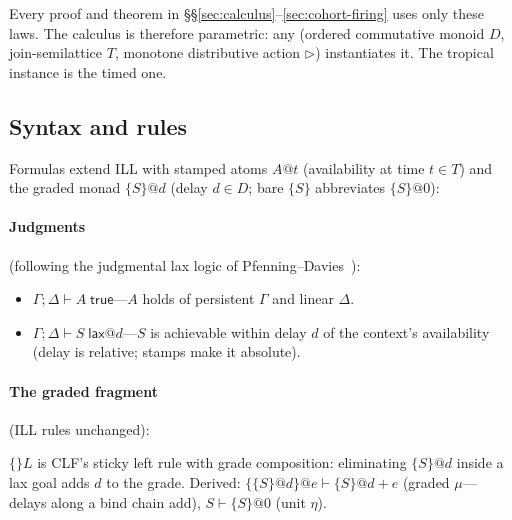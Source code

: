 \documentclass[11pt]{article}
\makeatletter
\newcommand{\action}{\triangleright}            %
\newcommand{\laxm}[2]{\{#1\}@{#2}}
\newcommand{\laxb}[1]{\{#1\}}
\newcommand{\jtrue}[1]{#1\;\mathsf{true}}
\newcommand{\jlax}[2]{#1\;\mathsf{lax}@{#2}}
\theoremstyle{remark}
\makeatother
\begin{document}
Every proof and theorem in \S\S\ref{sec:calculus}--\ref{sec:cohort-firing} uses
only these laws.  The calculus is therefore parametric: any (ordered commutative
monoid $D$, join-semilattice $T$, monotone distributive action $\action$)
instantiates it.  The tropical instance is the timed one.

\subsection{Syntax and rules}
\label{sec:syntax-rules}

Formulas extend ILL with stamped atoms $A@t$ (availability at time $t \in T$)
and the graded monad $\laxm{S}{d}$ (delay $d \in D$; bare $\laxb{S}$ abbreviates
$\laxm{S}{0}$):

\paragraph{Judgments} (following the judgmental lax logic of
Pfenning--Davies~\cite{PfenningDavies01}):

\begin{itemize}
\item $\Gamma;\Delta \vdash A\;\mathsf{true}$---$A$ holds of persistent $\Gamma$
  and linear $\Delta$.
\item $\Gamma;\Delta \vdash S\;\mathsf{lax}@d$---$S$ is achievable within delay
  $d$ of the context's availability (delay is relative; stamps make it absolute).
\end{itemize}

\paragraph{The graded fragment} (ILL rules unchanged):


$\{\}L$ is CLF's sticky left rule with grade composition: eliminating $\laxm{S}{d}$
inside a lax goal adds $d$ to the grade.  Derived: $\laxm{\laxm{S}{d}}{e} \vdash
\laxm{S}{d+e}$ (graded $\mu$---delays along a bind chain add),
$S \vdash \laxm{S}{0}$ (unit $\eta$).
\end{document}
